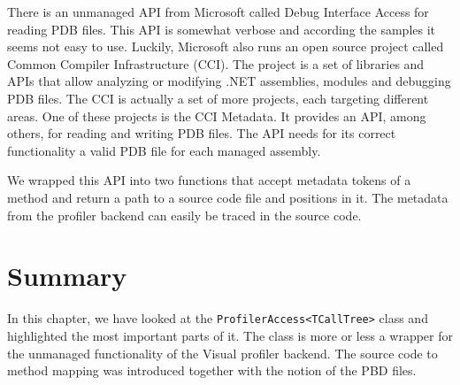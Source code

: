 There is an unmanaged API from Microsoft called Debug Interface Access for reading PDB files. This API is somewhat verbose and according the samples it seems not easy to use. Luckily, Microsoft also runs an open source project called Common Compiler Infrastructure (CCI). The project is a set of libraries and APIs that allow analyzing or modifying .NET assemblies, modules and debugging PDB files. The CCI is actually a set of more projects, each targeting different areas. One of these projects is the CCI Metadata. It provides an API, among others, for reading and writing PDB files. The API needs for its correct functionality a valid PDB file for each managed assembly.

We wrapped this API into two functions that accept metadata tokens of a method and return a path to a source code file and positions in it. The metadata from the profiler backend can easily be traced in the source code. 


\section{Summary}
In this chapter, we have looked at the \texttt{ProfilerAccess\textless TCallTree\textgreater} class and highlighted the most important parts of it. The class is more or less a wrapper for the unmanaged functionality of the Visual profiler backend. The source code to method mapping was introduced together with the notion of the PBD files.